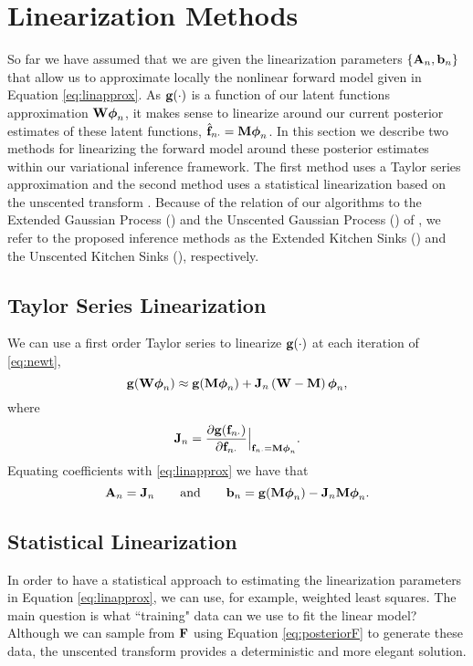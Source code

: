 \section{Linearization Methods}
So far we have assumed that we are given the linearization parameters $\{\mathbf{A}_n, \mathbf{b}_n\}$ that allow us to 
approximate locally the nonlinear forward model given in Equation   \eqref{eq:linapprox}. As 
$\mathbf{g}\!\left({{\cdot}}\right)$  is a function of our latent functions approximation ${\mathbf{W} \boldsymbol\phi_n}$,  
it makes sense to linearize around our current posterior estimates of these latent functions, 
$\hat{\mathbf{f}}_{n \cdot} =\mathbf{M} \boldsymbol\phi_n$. In this section we describe two methods for linearizing 
the  forward model around these posterior estimates within our variational 
inference framework. The first method uses a Taylor series approximation and the second 
method uses a statistical linearization \citep{Geist2010} based on the unscented transform \citep{Julier2004}. 
Because of the relation of our algorithms to the Extended Gaussian Process (\egp) and 
the  Unscented Gaussian Process (\ugp) of \citet{steinberg-bonilla-nips-2014},   we refer to 
the proposed inference methods as  the Extended Kitchen Sinks (\eks) and the 
Unscented Kitchen Sinks (\uks), respectively.
%
\subsection{Taylor Series Linearization}
\label{sub:taylor}
We can use a first order Taylor series to linearize $\mathbf{g}\!\left({{\cdot}}\right)$ at each
iteration of \eqref{eq:newt},
\begin{equation}
    \mathbf{g}\!\left({{\mathbf{W}\boldsymbol\phi_n}}\right) \approx \mathbf{g}\!\left({{\mathbf{M}\boldsymbol\phi_n}}\right) +
    \mathbf{J}_{n}\left({\mathbf{W} - \mathbf{M}}\right)\boldsymbol\phi_n,
\end{equation}
where 
\begin{equation}
\mathbf{J}_{n} = \frac{ \partial\mathbf{g}\!\left({{\mathbf{f}_{n \cdot}}}\right) } {  \partial \mathbf{f}_{n \cdot} }  \Big|_{\mathbf{f}_{n \cdot} = \mathbf{M} \boldsymbol\phi_n } \text{.}
\end{equation}
Equating coefficients with \eqref{eq:linapprox} we have that
\begin{equation}
    \mathbf{A}_n = \mathbf{J}_{n} \qquad \text{and} \qquad \mathbf{b}_n = 
        \mathbf{g}\!\left({{\mathbf{M}\boldsymbol\phi_n}}\right) - \mathbf{J}_{n}\mathbf{M}\boldsymbol\phi_n.
\end{equation}
%
\subsection{Statistical Linearization}
In order to have a  statistical approach to estimating the linearization parameters 
 in  Equation \eqref{eq:linapprox}, we can  use, for example, weighted least squares.  The main question 
is what ``training" data  can we use to fit the linear model? Although we can 
sample from $\mathbf{F}$ using Equation \eqref{eq:posteriorF} to generate these data, 
the unscented transform  \citep[\ut;][]{Julier2004} provides a deterministic and more elegant solution. 

